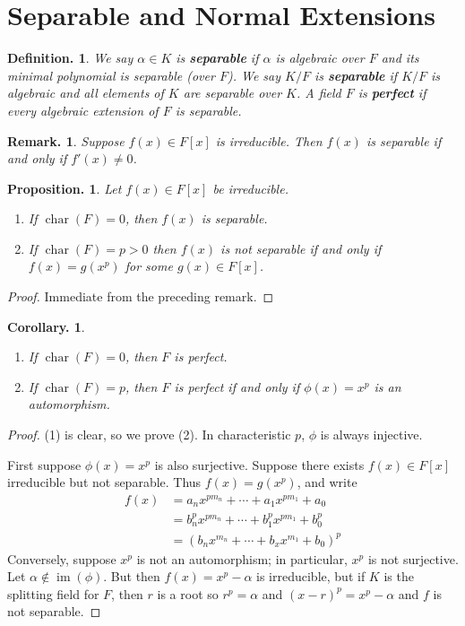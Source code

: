 \documentclass[11pt, a4paper]{memoir}
\newcommand{\mbf}[1]{{\boldmath\bfseries #1}}
\theoremstyle{change}
\newtheorem{corollary}[theorem]{Corollary.}
\newtheorem{proposition}[theorem]{Proposition.}
\theoremstyle{plain}
\theoremstyle{nonumberplain}
\newtheorem{definition}{Definition.}
\newtheorem{remark}{Remark.}
\newtheorem{proof}{Proof}
\DeclareMathOperator{\chr}{char}
\DeclareMathOperator{\im}{im}
\numberwithin{equation}{section}
\begin{document}
\section{Separable and Normal Extensions}
\begin{definition}
    We say $\alpha\in K$ is \mbf{separable} if $\alpha$ is algebraic over $F$ and its minimal polynomial is separable (over $F$).
    We say $K/F$ is \mbf{separable} if $K/F$ is algebraic and all elements of $K$ are separable over $K$.
    A field $F$ is \mbf{perfect} if every algebraic extension of $F$ is separable.
\end{definition}
\begin{remark}
    Suppose $f(x)\in F[x]$ is irreducible.
    Then $f(x)$ is separable if and only if $f'(x)\neq 0$.
\end{remark}
\begin{proposition}
    Let $f(x)\in F[x]$ be irreducible.
    \begin{enumerate}[nolistsep]
        \item If $\chr(F)=0$, then $f(x)$ is separable.
        \item If $\chr(F)=p>0$ then $f(x)$ is not separable if and only if $f(x)=g(x^p)$ for some $g(x)\in F[x]$.
    \end{enumerate}
\end{proposition}
\begin{proof}
    Immediate from the preceding remark.
\end{proof}
\begin{corollary}
    \begin{enumerate}[nl]
        \item If $\chr(F)=0$, then $F$ is perfect.
        \item If $\chr(F)=p$, then $F$ is perfect if and only if $\phi(x)=x^p$ is an automorphism.
    \end{enumerate}
\end{corollary}
\begin{proof}
    (1) is clear, so we prove (2).
    In characteristic $p$, $\phi$ is always injective.

    First suppose $\phi(x)=x^p$ is also surjective.
    Suppose there exists $f(x)\in F[x]$ irreducible but not separable.
    Thus $f(x)=g(x^p)$, and write
    \begin{align*}
        f(x) &=a_nx^{pm_n}+\cdots+a_1x^{pm_1}+a_0\\
             &=b_n^px^{pm_n}+\cdots+b_1^px^{pm_1}+b_0^p\\
             &= (b_nx^{m_n}+\cdots+b_xx^{m_1}+b_0)^p
    \end{align*}
    Conversely, suppose $x^p$ is not an automorphism; in particular, $x^p$ is not surjective.
    Let $\alpha\notin\im(\phi)$.
    But then $f(x)=x^p-\alpha$ is irreducible, but if $K$ is the splitting field for $F$, then $r$ is a root so $r^p=\alpha$ and $(x-r)^p=x^p-\alpha$ and $f$ is not separable.
\end{proof}
\end{document}
